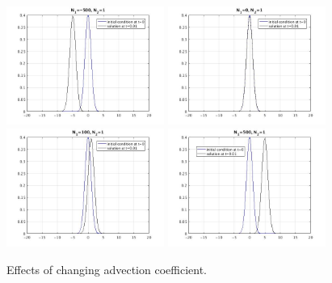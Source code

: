 \documentclass[12pt]{article}
\begin{document}
\begin{figure}[!htbp]
\begin{center}

\includegraphics[width=0.46\textwidth]{advec-500.jpg} 
\includegraphics[width=0.46\textwidth]{advec0.jpg}  \\
\hspace*{0.2truecm}
\includegraphics[width=0.46\textwidth]{norm.jpg}  
\includegraphics[width=0.46\textwidth]{advec500.jpg}  \\

\caption{Effects of changing advection coefficient.} 
\label{fig1}
\end{center}
\end{figure}
\end{document}

